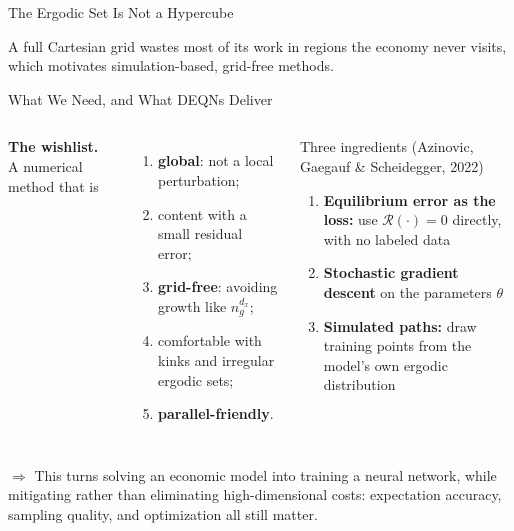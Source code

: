 \documentclass[aspectratio=169,11pt]{beamer}
\newcommand{\emphc}[1]{\textcolor{harvardcrimson}{#1}}
\newcommand{\param}{\theta}          %
\newcommand{\resid}{\mathcal{R}}     %
\begin{document}
\begin{frame}{The Ergodic Set Is Not a Hypercube}
\begin{center}
\end{center}

\begin{center}
{\footnotesize A full Cartesian grid \emphc{wastes} most of its work in regions the economy never visits, which motivates \emphc{simulation-based, grid-free} methods.}
\end{center}
\end{frame}

\begin{frame}{What We Need, and What DEQNs Deliver}
\begin{columns}[T]
\textbf{The wishlist.} A numerical method that is
\begin{enumerate}
    \setlength{\itemsep}{2pt}
    \item \textbf{global}: not a local perturbation;
    \item content with a small residual error;
    \item \textbf{grid-free}: avoiding growth like $n_g^{d_x}$;
    \item comfortable with kinks and irregular ergodic sets;
    \item \textbf{parallel-friendly}.
\end{enumerate}

\begin{block}{Three ingredients (Azinovic, Gaegauf \& Scheidegger, 2022)}
\begin{enumerate}\itemsep2pt
    \item \textbf{Equilibrium error as the loss:} use $\resid(\cdot) = 0$ directly, with \emphc{no labeled data}
    \item \textbf{Stochastic gradient descent} on the parameters $\param$
    \item \textbf{Simulated paths:} draw training points from the model's own \emphc{ergodic distribution}
\end{enumerate}
\end{block}
\end{columns}

\vspace{0.4em}
\begin{center}
{\footnotesize $\Rightarrow$ This turns \emphc{solving} an economic model into \emphc{training} a neural network, while \emphc{mitigating} rather than eliminating high-dimensional costs: expectation accuracy, sampling quality, and optimization all still matter.}
\end{center}
\end{frame}
\end{document}
